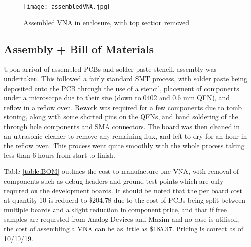 \begin{figure}[H]
	\centering
	\texttt{[image: assembledVNA.jpg]}
	\caption{Assembled VNA in enclosure, with top section removed}
	\label{fig:pcb_assembled}
\end{figure}

\subsection{Assembly + Bill of Materials}
Upon arrival of assembled PCBs and solder paste stencil, assembly was undertaken. This followed a fairly standard SMT process, with solder paste being deposited onto the PCB through the use of a stencil, placement of components under a microscope due to their size (down to 0402 and 0.5 mm QFN), and reflow in a reflow oven. Rework was required for a few components due to tomb stoning, along with some shorted pins on the QFNs, and hand soldering of the through hole components and SMA connectors. The board was then cleaned in an ultrasonic cleaner to remove any remaining flux, and left to dry for an hour in the reflow oven. This process went quite smoothly with the whole process taking less than 6 hours from start to finish. 

Table \ref{table:BOM} outlines the cost to manufacture one VNA, with removal of components such as debug headers and ground test points which are only required on the development boards. It should be noted that the per board cost at quantity 10 is reduced to \$204.78 due to the cost of PCBs being split between multiple boards and a slight reduction in component price, and that if free samples are requested from Analog Devices and Maxim and no case is utilised, the cost of assembling a VNA can be as little as \$185.37. Pricing is correct as of 10/10/19.


